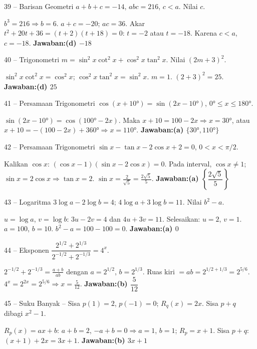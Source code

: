 \documentclass[11pt]{article}
\newcommand{\jawaban}[1]{\textbf{Jawaban:}\enspace\colorbox{gold!30}{\textbf{#1}}}
\begin{document}
\begin{soal}{39 -- Barisan Geometri}
$a+b+c=-14$, $abc=216$, $c<a$. Nilai $c$.
\end{soal}
\begin{pembox}
$b^3=216\Rightarrow b=6$. $a+c=-20$; $ac=36$. Akar $t^2+20t+36=(t+2)(t+18)=0$: $t=-2$ atau $t=-18$.
Karena $c<a$, $c=-18$.
\jawaban{(d) $-18$}
\end{pembox}

\begin{soal}{40 -- Trigonometri}
$m=\sin^2x\cot^2x+\cos^2x\tan^2x$. Nilai $(2m+3)^2$.
\end{soal}
\begin{pembox}
$\sin^2x\cot^2x=\cos^2x$; $\cos^2x\tan^2x=\sin^2x$. $m=1$. $(2+3)^2=25$.
\jawaban{(d) $25$}
\end{pembox}

\begin{soal}{41 -- Persamaan Trigonometri}
$\cos(x+10°)=\sin(2x-10°)$, $0°\leq x\leq180°$.
\end{soal}
\begin{pembox}
$\sin(2x-10°)=\cos(100°-2x)$. Maka $x+10=100-2x\Rightarrow x=30°$, atau $x+10=-(100-2x)+360°\Rightarrow x=110°$.
\jawaban{(a) $\{30°,110°\}$}
\end{pembox}

\begin{soal}{42 -- Persamaan Trigonometri}
$\sin x-\tan x-2\cos x+2=0$, $0<x<\pi/2$.
\end{soal}
\begin{pembox}
Kalikan $\cos x$: $(\cos x-1)(\sin x-2\cos x)=0$. Pada interval, $\cos x\neq1$; $\sin x=2\cos x\Rightarrow\tan x=2$.
$\sin x=\frac{2}{\sqrt5}=\frac{2\sqrt5}{5}$.
\jawaban{(a) $\left\{\dfrac{2\sqrt5}{5}\right\}$}
\end{pembox}

\begin{soal}{43 -- Logaritma}
$3\log a-2\log b=4$; $4\log a+3\log b=11$. Nilai $b^2-a$.
\end{soal}
\begin{pembox}
$u=\log a$, $v=\log b$: $3u-2v=4$ dan $4u+3v=11$. Selesaikan: $u=2$, $v=1$.
$a=100$, $b=10$. $b^2-a=100-100=0$.
\jawaban{(a) $0$}
\end{pembox}

\begin{soal}{44 -- Eksponen}
$\dfrac{2^{1/2}+2^{1/3}}{2^{-1/2}+2^{-1/3}}=4^x$.
\end{soal}
\begin{pembox}
$2^{-1/2}+2^{-1/3}=\frac{a+b}{ab}$ dengan $a=2^{1/2}$, $b=2^{1/3}$.
Ruas kiri $=ab=2^{1/2+1/3}=2^{5/6}$. $4^x=2^{2x}=2^{5/6}\Rightarrow x=\frac{5}{12}$.
\jawaban{(b) $\dfrac{5}{12}$}
\end{pembox}

\begin{soal}{45 -- Suku Banyak -- Sisa}
$p(1)=2$, $p(-1)=0$; $R_q(x)=2x$. Sisa $p+q$ dibagi $x^2-1$.
\end{soal}
\begin{pembox}
$R_p(x)=ax+b$: $a+b=2$, $-a+b=0\Rightarrow a=1$, $b=1$; $R_p=x+1$.
Sisa $p+q$: $(x+1)+2x=3x+1$.
\jawaban{(b) $3x+1$}
\end{pembox}
\end{document}
